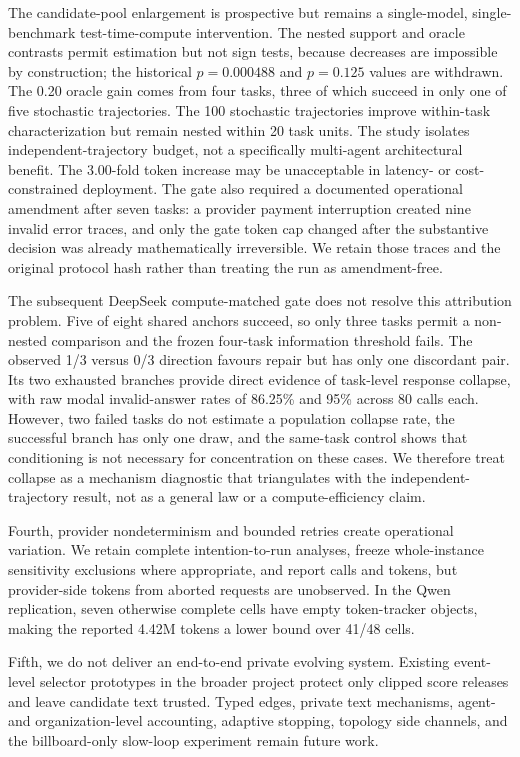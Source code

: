 \documentclass{article}
\begin{document}
The candidate-pool enlargement is prospective but remains a single-model, single-benchmark test-time-compute intervention. The nested support and oracle contrasts permit estimation but not sign tests, because decreases are impossible by construction; the historical \(p=0.000488\) and \(p=0.125\) values are withdrawn. The 0.20 oracle gain comes from four tasks, three of which succeed in only one of five stochastic trajectories. The 100 stochastic trajectories improve within-task characterization but remain nested within 20 task units. The study isolates independent-trajectory budget, not a specifically multi-agent architectural benefit. The 3.00-fold token increase may be unacceptable in latency- or cost-constrained deployment. The gate also required a documented operational amendment after seven tasks: a provider payment interruption created nine invalid error traces, and only the gate token cap changed after the substantive decision was already mathematically irreversible. We retain those traces and the original protocol hash rather than treating the run as amendment-free.

The subsequent DeepSeek compute-matched gate does not resolve this attribution problem. Five of eight shared anchors succeed, so only three tasks permit a non-nested comparison and the frozen four-task information threshold fails. The observed 1/3 versus 0/3 direction favours repair but has only one discordant pair. Its two exhausted branches provide direct evidence of task-level response collapse, with raw modal invalid-answer rates of 86.25\% and 95\% across 80 calls each. However, two failed tasks do not estimate a population collapse rate, the successful branch has only one draw, and the same-task control shows that conditioning is not necessary for concentration on these cases. We therefore treat collapse as a mechanism diagnostic that triangulates with the independent-trajectory result, not as a general law or a compute-efficiency claim.

Fourth, provider nondeterminism and bounded retries create operational variation. We retain complete intention-to-run analyses, freeze whole-instance sensitivity exclusions where appropriate, and report calls and tokens, but provider-side tokens from aborted requests are unobserved. In the Qwen replication, seven otherwise complete cells have empty token-tracker objects, making the reported 4.42M tokens a lower bound over 41/48 cells.

Fifth, we do not deliver an end-to-end private evolving system. Existing event-level selector prototypes in the broader project protect only clipped score releases and leave candidate text trusted. Typed edges, private text mechanisms, agent- and organization-level accounting, adaptive stopping, topology side channels, and the billboard-only slow-loop experiment remain future work.
\end{document}
